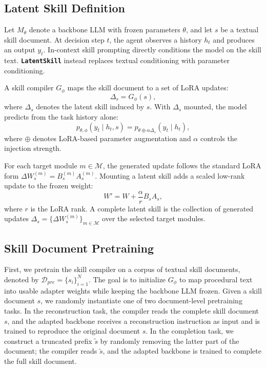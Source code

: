 \documentclass{llmxive}
\providecommand{\textttt}[1]{\texttt{#1}}
\providecommand{\method}{\textbf{\textttt{LatentSkill}}}
\begin{document}
\subsection{Latent Skill Definition}
\label{sec:latent_skill_definition}

Let $M_\theta$ denote a backbone LLM with frozen parameters $\theta$, and let $s$ be a textual skill document. At decision step $t$, the agent observes a history $h_t$ and produces an output $y_t$. In-context skill prompting directly conditions the model on the skill text. \method{} instead replaces textual conditioning with parameter conditioning.

A skill compiler $G_\phi$ maps the skill document to a set of LoRA updates:
\begin{equation}
    \Delta_s = G_\phi(s),
\end{equation}
where $\Delta_s$ denotes the latent skill induced by $s$. With $\Delta_s$ mounted, the model predicts from the task history alone:
\begin{equation}
    p_{\theta,\phi}(y_t \mid h_t, s)
    =
    p_{\theta \oplus \alpha \Delta_s}(y_t \mid h_t),
\end{equation}
where $\oplus$ denotes LoRA-based parameter augmentation and $\alpha$ controls the injection strength.

For each target module $m \in \mathcal{M}$, the generated update follows the standard LoRA form $\Delta W_s^{(m)}=B_s^{(m)}A_s^{(m)}$. Mounting a latent skill adds a scaled low-rank update to the frozen weight:
\begin{equation}
    W'
    =
    W
    +
    \frac{\alpha}{r} B_s A_s ,
\end{equation}
where $r$ is the LoRA rank. A complete latent skill is the collection of generated updates $\Delta_s=\{\Delta W_s^{(m)}\}_{m\in\mathcal{M}}$ over the selected target modules. 

\subsection{Skill Document Pretraining}
\label{sec:pretraining}

First, we pretrain the skill compiler on a corpus
of textual skill documents, denoted by \(\mathcal{D}_{pre} =
\{s_i\}_{i=1}^N\). The goal is to initialize \(G_\phi\) to map procedural text into usable adapter weights while keeping the backbone LLM frozen.
Given a skill document \(s\), we randomly instantiate one of two document-level pretraining tasks. In the reconstruction task, the compiler reads the complete skill document \(s\), and the adapted backbone receives a reconstruction instruction as input and is trained to reproduce the original document \(s\). In the completion task, we construct a truncated prefix \(\tilde{s}\) by randomly removing the latter part of the document; the compiler reads \(\tilde{s}\), and the adapted backbone is trained to complete the full skill document.
\end{document}
